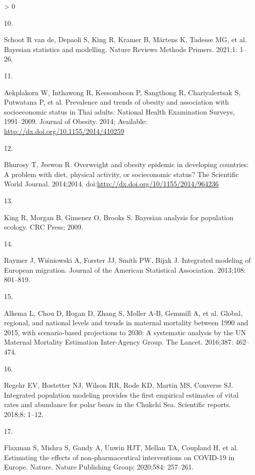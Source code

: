 \documentclass[10pt,letterpaper]{article}
\newlength{\csllabelwidth}
\newlength{\cslhangindent}
\newenvironment{CSLReferences}[2] %
 {%
  \setlength{\parindent}{0pt}
  \ifodd #1 \everypar{\setlength{\hangindent}{\cslhangindent}}\ignorespaces\fi
  \ifnum #2 > 0
  \setlength{\parskip}{#2\baselineskip}
  \fi
 }%
 {}
\newcommand{\CSLLeftMargin}[1]{\parbox[t]{\csllabelwidth}{#1}}
\newcommand{\CSLRightInline}[1]{\parbox[t]{\linewidth - \csllabelwidth}{#1}\break}
\begin{document}
\begin{CSLReferences}{0}{0}
\leavevmode\hypertarget{ref-van2021bayesian}{}%
\CSLLeftMargin{10. }
\CSLRightInline{Schoot R van de, Depaoli S, King R, Kramer B, Märtens K,
Tadesse MG, et al. Bayesian statistics and modelling. Nature Reviews
Methods Primers. 2021;1: 1--26. }

\leavevmode\hypertarget{ref-aekplakorn2014prevalence}{}%
\CSLLeftMargin{11. }
\CSLRightInline{Aekplakorn W, Inthawong R, Kessomboon P, Sangthong R,
Chariyalertsak S, Putwatana P, et al. Prevalence and trends of obesity
and association with socioeconomic status in {T}hai adults: {N}ational
{H}ealth {E}xamination {S}urveys, 1991--2009. Journal of Obesity. 2014;
Available: \url{http://dx.doi.org/10.1155/2014/410259}}

\leavevmode\hypertarget{ref-bhurosy2014overweight}{}%
\CSLLeftMargin{12. }
\CSLRightInline{Bhurosy T, Jeewon R. Overweight and obesity epidemic in
developing countries: A problem with diet, physical activity, or
socieconomic status? The Scientific World Journal. 2014;2014.
doi:\url{http://dx.doi.org/10/1155/2014/964236}}

\leavevmode\hypertarget{ref-king2009bayesian}{}%
\CSLLeftMargin{13. }
\CSLRightInline{King R, Morgan B, Gimenez O, Brooks S. Bayesian analysis
for population ecology. CRC Press; 2009. }

\leavevmode\hypertarget{ref-raymer2013integrated}{}%
\CSLLeftMargin{14. }
\CSLRightInline{Raymer J, Wiśniowski A, Forster JJ, Smith PW, Bijak J.
Integrated modeling of {E}uropean migration. Journal of the American
Statistical Association. 2013;108: 801--819. }

\leavevmode\hypertarget{ref-alkema2016global}{}%
\CSLLeftMargin{15. }
\CSLRightInline{Alkema L, Chou D, Hogan D, Zhang S, Moller A-B, Gemmill
A, et al. Global, regional, and national levels and trends in maternal
mortality between 1990 and 2015, with scenario-based projections to
2030: A systematic analysis by the {UN} {M}aternal {M}ortality
{E}stimation {I}nter-{A}gency {G}roup. The Lancet. 2016;387: 462--474. }

\leavevmode\hypertarget{ref-regehr2018integrated}{}%
\CSLLeftMargin{16. }
\CSLRightInline{Regehr EV, Hostetter NJ, Wilson RR, Rode KD, Martin MS,
Converse SJ. Integrated population modeling provides the first empirical
estimates of vital rates and abundance for polar bears in the {C}hukchi
{S}ea. Scientific reports. 2018;8: 1--12. }

\leavevmode\hypertarget{ref-flaxman2020estimating}{}%
\CSLLeftMargin{17. }
\CSLRightInline{Flaxman S, Mishra S, Gandy A, Unwin HJT, Mellan TA,
Coupland H, et al. Estimating the effects of non-pharmaceutical
interventions on {COVID}-19 in {E}urope. Nature. Nature Publishing
Group; 2020;584: 257--261. }


\end{CSLReferences}
\end{document}

